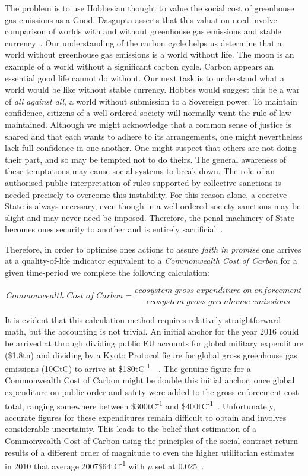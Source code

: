 \documentclass[11pt, oneside]{article}   	%
\begin{document}
The problem is to use Hobbesian thought to value the social cost of greenhouse gas emissions as a Good.
Dasgupta asserts that this valuation need involve comparison of worlds with and without greenhouse gas emissions and stable currency~\cite{pd2}.
Our understanding of the carbon cycle helps us determine that a world without greenhouse gas emissions is a world without life.
The moon is an example of a world without a significant carbon cycle.
Carbon appears an essential good life cannot do without.
Our next task is to understand what a world would be like without stable currency.
Hobbes would suggest this be a war of \emph{all against all}, a world without submission to a Sovereign power.
To maintain confidence, citizens of a well-ordered society will normally want the rule of law maintained.
Although we might acknowledge that a common sense of justice is shared and that each wants to adhere to its arrangements, one might nevertheless lack full confidence in one another.
One might suspect that others are not doing their part, and so may be tempted not to do theirs.
The general awareness of these temptations may cause social systems to break down.
The role of an authorised public interpretation of rules supported by collective sanctions is needed precisely to overcome this instability.
For this reason alone, a coercive State is always necessary, even though in a well-ordered society sanctions may be slight and may never need be imposed.
Therefore, the penal machinery of State becomes ones security to another and is entirely sacrificial~\cite{jr1}.\par

Therefore, in order to optimise ones actions to assure \emph{faith in promise} one arrives at a quality-of-life indicator equivalent to a \emph{Commonwealth Cost of Carbon} for a given time-period we complete the following calculation:

\begin{equation}
Commonwealth\; Cost\; of\; Carbon = \frac{ecosystem\; gross\; expenditure\; on\; enforcement}{ecosystem\; gross\; greenhouse\; emissions}
\end{equation}

It is evident that this calculation method requires relatively straightforward math, but the accounting is not trivial.
An initial anchor for the year 2016 could be arrived at through dividing public EU accounts for global military expenditure (\$1.8tn) and dividing by a Kyoto Protocol figure for global gross greenhouse gas emissions (10GtC) to arrive at \$180tC\textsuperscript{-1}~\cite{eu1}~\cite{co1}.
The genuine figure for a Commonwealth Cost of Carbon might be double this initial anchor, once global expenditure on public order and safety were added to the gross enforcement cost total, ranging somewhere between \$300tC\textsuperscript{-1} and \$400tC\textsuperscript{-1}~\cite{oecd1}.
Unfortunately, accurate figures for these expenditures remain difficult to obtain and involves considerable uncertainty.
This leads to the belief that estimation of a Commonwealth Cost of Carbon using the principles of the social contract return results of a different order of magnitude to even the higher utilitarian estimates in 2010 that average 2007\$64tC\textsuperscript{-1}  with $\mu$ set at 0.025~\cite{iwg1}.
\end{document}
